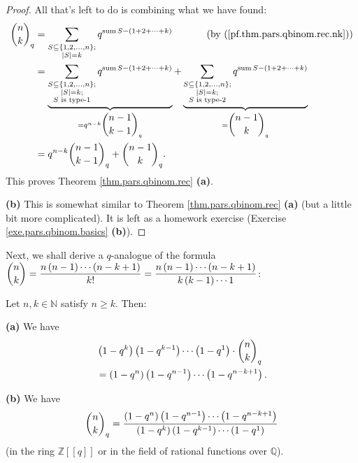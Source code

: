 \begin{proof}
All that's left to do is combining what we have found:%
\begin{align*}
\dbinom{n}{k}_{q}  &  =\sum_{\substack{S\subseteq\left\{  1,2,\ldots
,n\right\}  ;\\\left\vert S\right\vert =k}}q^{\operatorname*{sum}S-\left(
1+2+\cdots+k\right)  }\ \ \ \ \ \ \ \ \ \ \left(  \text{by
(\ref{pf.thm.pars.qbinom.rec.nk})}\right) \\
&  =\underbrace{\sum_{\substack{S\subseteq\left\{  1,2,\ldots,n\right\}
;\\\left\vert S\right\vert =k;\\S\text{ is type-1}}}q^{\operatorname*{sum}%
S-\left(  1+2+\cdots+k\right)  }}_{=q^{n-k}\dbinom{n-1}{k-1}_{q}%
}+\underbrace{\sum_{\substack{S\subseteq\left\{  1,2,\ldots,n\right\}
;\\\left\vert S\right\vert =k;\\S\text{ is type-2}}}q^{\operatorname*{sum}%
S-\left(  1+2+\cdots+k\right)  }}_{=\dbinom{n-1}{k}_{q}}\\
&  =q^{n-k}\dbinom{n-1}{k-1}_{q}+\dbinom{n-1}{k}_{q}.
\end{align*}
This proves Theorem \ref{thm.pars.qbinom.rec} \textbf{(a)}. \medskip

\textbf{(b)} This is somewhat similar to Theorem \ref{thm.pars.qbinom.rec}
\textbf{(a)} (but a little bit more complicated). It is left as a homework
exercise (Exercise \ref{exe.pars.qbinom.basics} \textbf{(b)}).
\end{proof}

Next, we shall derive a $q$-analogue of the formula $\dbinom{n}{k}%
=\dfrac{n\left(  n-1\right)  \cdots\left(  n-k+1\right)  }{k!}=\dfrac{n\left(
n-1\right)  \cdots\left(  n-k+1\right)  }{k\left(  k-1\right)  \cdots1}$:

\begin{theorem}
\label{thm.pars.qbinom.quot1}Let $n,k\in\mathbb{N}$ satisfy $n\geq k$. Then:
\medskip

\textbf{(a)} We have%
\begin{align*}
&  \left(  1-q^{k}\right)  \left(  1-q^{k-1}\right)  \cdots\left(
1-q^{1}\right)  \cdot\dbinom{n}{k}_{q}\\
&  =\left(  1-q^{n}\right)  \left(  1-q^{n-1}\right)  \cdots\left(
1-q^{n-k+1}\right)  .
\end{align*}


\textbf{(b)} We have%
\[
\dbinom{n}{k}_{q}=\dfrac{\left(  1-q^{n}\right)  \left(  1-q^{n-1}\right)
\cdots\left(  1-q^{n-k+1}\right)  }{\left(  1-q^{k}\right)  \left(
1-q^{k-1}\right)  \cdots\left(  1-q^{1}\right)  }%
\]
(in the ring $\mathbb{Z}\left[  \left[  q\right]  \right]  $ or in the field
of rational functions over $\mathbb{Q}$).
\end{theorem}

